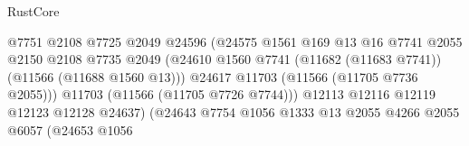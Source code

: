 \begin{lexlean}{RustCore}
\begin{coremodule}
                                                    @7751
                                                    @2108
                                                    @7725
                                                    @2049
                                                    @24596
                                                    (@24575
                                                      @1561
                                                      @169
                                                      @13
                                                      @16
                                                      @7741
                                                      @2055
                                                      @2150
                                                      @2108
                                                      @7735
                                                      @2049
                                                      (@24610
                                                        @1560
                                                        @7741
                                                        (@11682 (@11683 @7741))
                                                        (@11566 (@11688 @1560 @13)))
                                                      @24617
                                                      @11703
                                                      (@11566 (@11705 @7736 @2055)))
                                                    @11703
                                                    (@11566 (@11705 @7726 @7744)))
                                                  @12113
                                                  @12116
                                                  @12119
                                                  @12123
                                                  @12128
                                                  @24637)
                                                (@24643
                                                  @7754
                                                  @1056
                                                  @1333
                                                  @13
                                                  @2055
                                                  @4266
                                                  @2055
                                                  @6057
                                                  (@24653
                                                    @1056

\end{coremodule}
\end{lexlean}
